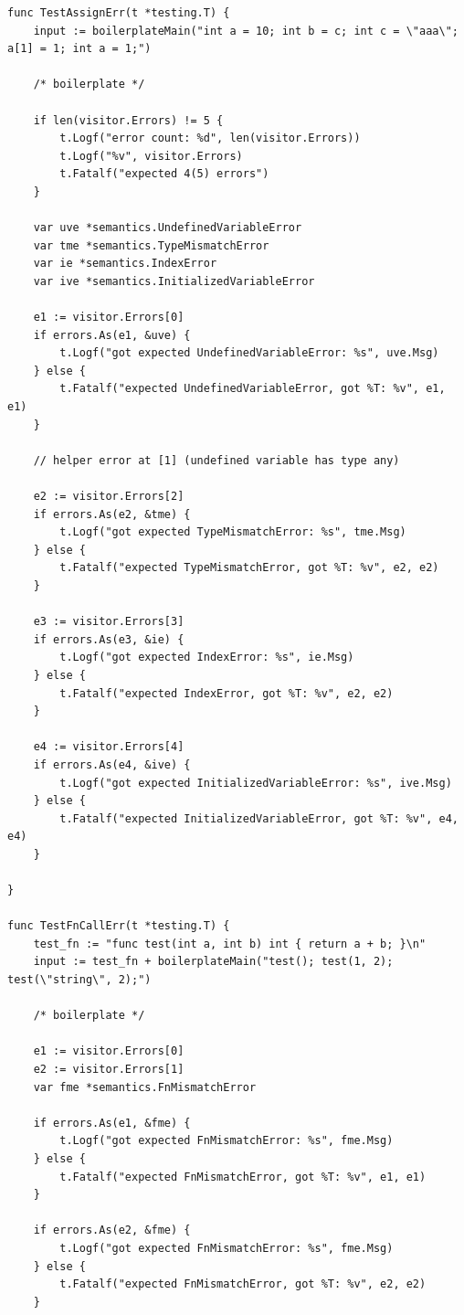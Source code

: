 \begin{lstlisting}[caption={Testy reguł parsera}, label={lst:tst-wizyty}, morekeywords={func, nil, any}]
func TestAssignErr(t *testing.T) {
    input := boilerplateMain("int a = 10; int b = c; int c = \"aaa\"; a[1] = 1; int a = 1;")
	
	/* boilerplate */

    if len(visitor.Errors) != 5 {
		t.Logf("error count: %d", len(visitor.Errors))
		t.Logf("%v", visitor.Errors)
		t.Fatalf("expected 4(5) errors")
    }

    var uve *semantics.UndefinedVariableError
    var tme *semantics.TypeMismatchError
    var ie *semantics.IndexError
    var ive *semantics.InitializedVariableError

    e1 := visitor.Errors[0]
    if errors.As(e1, &uve) {
		t.Logf("got expected UndefinedVariableError: %s", uve.Msg)
    } else {
		t.Fatalf("expected UndefinedVariableError, got %T: %v", e1, e1)
    }

    // helper error at [1] (undefined variable has type any)

    e2 := visitor.Errors[2]
    if errors.As(e2, &tme) {
		t.Logf("got expected TypeMismatchError: %s", tme.Msg)
    } else {
		t.Fatalf("expected TypeMismatchError, got %T: %v", e2, e2)
    }

    e3 := visitor.Errors[3]
    if errors.As(e3, &ie) {
		t.Logf("got expected IndexError: %s", ie.Msg)
    } else {
		t.Fatalf("expected IndexError, got %T: %v", e2, e2)
    }

    e4 := visitor.Errors[4]
    if errors.As(e4, &ive) {
		t.Logf("got expected InitializedVariableError: %s", ive.Msg)
    } else {
		t.Fatalf("expected InitializedVariableError, got %T: %v", e4, e4)
    }

}

func TestFnCallErr(t *testing.T) {
    test_fn := "func test(int a, int b) int { return a + b; }\n"
    input := test_fn + boilerplateMain("test(); test(1, 2); test(\"string\", 2);")

	/* boilerplate */

    e1 := visitor.Errors[0]
    e2 := visitor.Errors[1]
    var fme *semantics.FnMismatchError

    if errors.As(e1, &fme) {
		t.Logf("got expected FnMismatchError: %s", fme.Msg)
    } else {
		t.Fatalf("expected FnMismatchError, got %T: %v", e1, e1)
    }

    if errors.As(e2, &fme) {
		t.Logf("got expected FnMismatchError: %s", fme.Msg)
    } else {
		t.Fatalf("expected FnMismatchError, got %T: %v", e2, e2)
    }


\end{lstlisting}
